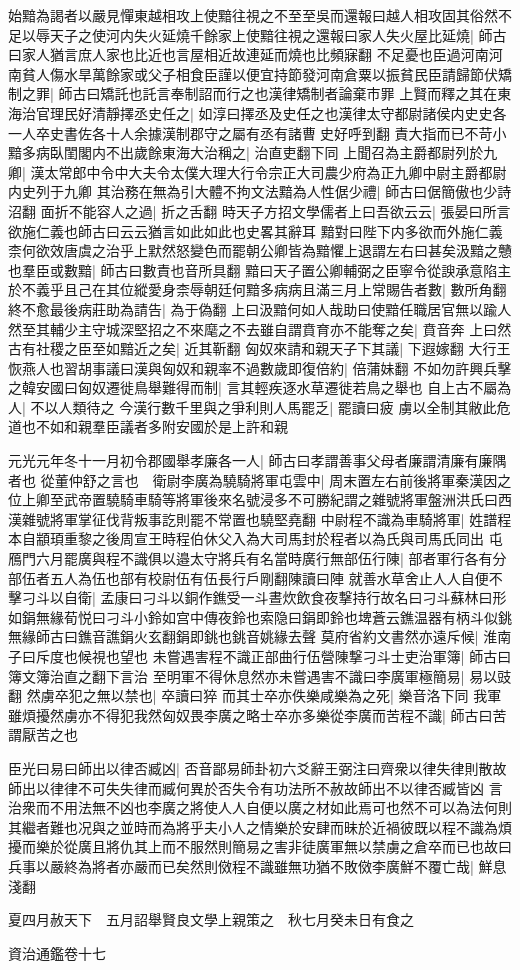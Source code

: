 始黯為謁者以嚴見憚東越相攻上使黯往視之不至至吳而還報曰越人相攻固其俗然不足以辱天子之使河内失火延燒千餘家上使黯往視之還報曰家人失火屋比延燒|{
	師古曰家人猶言庶人家也比近也言屋相近故連延而燒也比頻寐翻}
不足憂也臣過河南河南貧人傷水旱萬餘家或父子相食臣謹以便宜持節發河南倉粟以振貧民臣請歸節伏矯制之罪|{
	師古曰矯託也託言奉制詔而行之也漢律矯制者論棄市罪}
上賢而釋之其在東海治官理民好清靜擇丞史任之|{
	如淳曰擇丞及史任之也漢律太守都尉諸侯内史史各一人卒史書佐各十人余據漢制郡守之屬有丞有諸曹史好呼到翻}
責大指而已不苛小黯多病臥閨閣内不出歲餘東海大治稱之|{
	治直吏翻下同}
上聞召為主爵都尉列於九卿|{
	漢太常郎中令中大夫令太僕大理大行令宗正大司農少府為正九卿中尉主爵都尉内史列于九卿}
其治務在無為引大體不拘文法黯為人性倨少禮|{
	師古曰倨簡傲也少詩沼翻}
面折不能容人之過|{
	折之舌翻}
時天子方招文學儒者上曰吾欲云云|{
	張晏曰所言欲施仁義也師古曰云云猶言如此如此也史畧其辭耳}
黯對曰陛下内多欲而外施仁義柰何欲效唐虞之治乎上默然怒變色而罷朝公卿皆為黯懼上退謂左右曰甚矣汲黯之戇也羣臣或數黯|{
	師古曰數責也音所具翻}
黯曰天子置公卿輔弼之臣寧令從諛承意陷主於不義乎且己在其位縱愛身柰辱朝廷何黯多病病且滿三月上常賜告者數|{
	數所角翻}
終不愈最後病莊助為請告|{
	為于偽翻}
上曰汲黯何如人哉助曰使黯任職居官無以踰人然至其輔少主守城深堅招之不來麾之不去雖自謂賁育亦不能奪之矣|{
	賁音奔}
上曰然古有社稷之臣至如黯近之矣|{
	近其靳翻}
匈奴來請和親天子下其議|{
	下遐嫁翻}
大行王恢燕人也習胡事議曰漢與匈奴和親率不過數歲即復倍約|{
	倍蒲妹翻}
不如勿許興兵擊之韓安國曰匈奴遷徙鳥舉難得而制|{
	言其輕疾逐水草遷徙若鳥之舉也}
自上古不屬為人|{
	不以人類待之}
今漢行數千里與之爭利則人馬罷乏|{
	罷讀曰疲}
虜以全制其敝此危道也不如和親羣臣議者多附安國於是上許和親

元光元年冬十一月初令郡國舉孝廉各一人|{
	師古曰孝謂善事父母者廉謂清廉有廉隅者也}
從董仲舒之言也　衛尉李廣為驍騎將軍屯雲中|{
	周末置左右前後將軍秦漢因之位上卿至武帝置驍騎車騎等將軍後來名號浸多不可勝紀謂之雜號將軍盤洲洪氏曰西漢雜號將軍掌征伐背叛事訖則罷不常置也驍堅堯翻}
中尉程不識為車騎將軍|{
	姓譜程本自顓頊重黎之後周宣王時程伯休父入為大司馬封於程者以為氏與司馬氏同出}
屯鴈門六月罷廣與程不識俱以邉太守將兵有名當時廣行無部伍行陳|{
	部者軍行各有分部伍者五人為伍也部有校尉伍有伍長行戶剛翻陳讀曰陣}
就善水草舍止人人自便不擊刁斗以自衛|{
	孟康曰刁斗以銅作鐎受一斗晝炊飲食夜撃持行故名曰刁斗蘇林曰形如鋗無緣荀悦曰刁斗小鈴如宫中傳夜鈴也索隐曰鋗即鈴也埤蒼云鐎温器有柄斗似銚無緣師古曰鐎音譙鋗火玄翻鋗即銚也銚音姚緣去聲}
莫府省約文書然亦遠斥候|{
	淮南子曰斥度也候視也望也}
未嘗遇害程不識正部曲行伍營陳撃刁斗士吏治軍簿|{
	師古曰簿文簿治直之翻下言治}
至明軍不得休息然亦未嘗遇害不識曰李廣軍極簡易|{
	易以豉翻}
然虜卒犯之無以禁也|{
	卒讀曰猝}
而其士卒亦佚樂咸樂為之死|{
	樂音洛下同}
我軍雖煩擾然虜亦不得犯我然匈奴畏李廣之略士卒亦多樂從李廣而苦程不識|{
	師古曰苦謂厭苦之也}


臣光曰易曰師出以律否臧凶|{
	否音鄙易師卦初六爻辭王弼注曰齊衆以律失律則散故師出以律律不可失失律而臧何異於否失令有功法所不赦故師出不以律否臧皆凶}
言治衆而不用法無不凶也李廣之將使人人自便以廣之材如此焉可也然不可以為法何則其繼者難也况與之並時而為將乎夫小人之情樂於安肆而昧於近禍彼既以程不識為煩擾而樂於從廣且將仇其上而不服然則簡易之害非徒廣軍無以禁虜之倉卒而已也故曰兵事以嚴終為將者亦嚴而已矣然則傚程不識雖無功猶不敗傚李廣鮮不覆亡哉|{
	鮮息淺翻}


夏四月赦天下　五月詔舉賢良文學上親策之　秋七月癸未日有食之

資治通鑑卷十七
